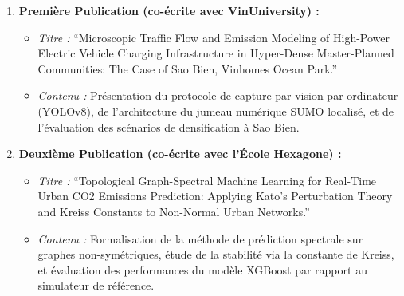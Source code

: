 \documentclass[10pt, a4paper]{article}
\providecommand{\tightlist}{}
\begin{document}
\begin{enumerate}
\def\labelenumi{\arabic{enumi}.}
\tightlist
\item
  \textbf{Première Publication (co-écrite avec VinUniversity) :}

  \begin{itemize}
  \tightlist
  \item
    \emph{Titre :} ``Microscopic Traffic Flow and Emission Modeling of
    High-Power Electric Vehicle Charging Infrastructure in Hyper-Dense
    Master-Planned Communities: The Case of Sao Bien, Vinhomes Ocean
    Park.''
  \item
    \emph{Contenu :} Présentation du protocole de capture par vision par
    ordinateur (YOLOv8), de l'architecture du jumeau numérique SUMO
    localisé, et de l'évaluation des scénarios de densification à Sao
    Bien.
  \end{itemize}
\item
  \textbf{Deuxième Publication (co-écrite avec l'École Hexagone) :}

  \begin{itemize}
  \tightlist
  \item
    \emph{Titre :} ``Topological Graph-Spectral Machine Learning for
    Real-Time Urban CO2 Emissions Prediction: Applying Kato's
    Perturbation Theory and Kreiss Constants to Non-Normal Urban
    Networks.''
  \item
    \emph{Contenu :} Formalisation de la méthode de prédiction spectrale
    sur graphes non-symétriques, étude de la stabilité via la constante
    de Kreiss, et évaluation des performances du modèle XGBoost par
    rapport au simulateur de référence.
  \end{itemize}
\end{enumerate}
\end{document}
